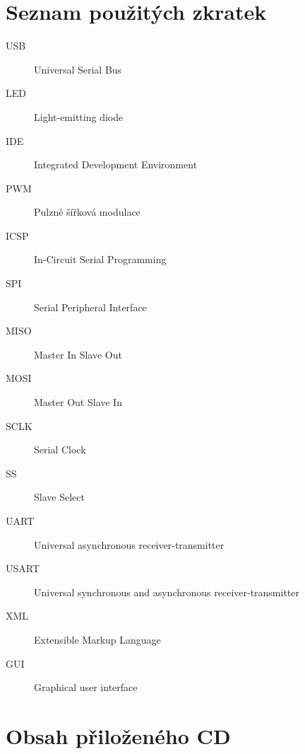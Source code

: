 \documentclass[thesis=B,czech]{FITthesis}[2012/06/26]
\begin{document}
\chapter{Seznam použitých zkratek}
\begin{description}
	\item[USB] Universal Serial Bus
	\item[LED] Light-emitting diode
	\item[IDE] Integrated Development Environment
	\item[PWM] Pulzně šířková modulace
	\item[ICSP] In-Circuit Serial Programming
	\item[SPI] Serial Peripheral Interface
	\item[MISO] Master In Slave Out
	\item[MOSI] Master Out Slave In	
	\item[SCLK] Serial Clock
	\item[SS] Slave Select
	\item[UART] Universal asynchronous receiver-transmitter	
	\item[USART] Universal synchronous and asynchronous receiver-transmitter	
	\item[XML] Extensible Markup Language
	\item[GUI] Graphical user interface
\end{description}


\chapter{Obsah přiloženého CD}


\begin{figure}
\end{figure}
\end{document}
